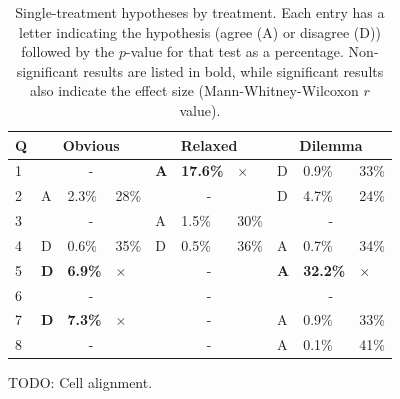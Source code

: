 \begin{table}[!hp]
  \centering
\bgroup
\def\arraystretch{1.1}
\setlength{\tabcolsep}{0.7em}
\begin{tabular}{p{0.3em} | p{0.3em} | p{1.8em} | p{1.2em} | p{0.3em} | p{1.8em} | p{1.2em} | p{0.3em} | p{1.8em} | p{1.2em} |}
Q & \multicolumn{3}{|c|}{Obvious} & \multicolumn{3}{|c|}{Relaxed} & \multicolumn{3}{|c|}{Dilemma} \\
\hline
1  & \multicolumn{3}{|c|}{-} & \textbf{A} & \textbf{17.6\%} & $\times$  & D & 0.9\% & 33\% \\
\hline
2  & A & 2.3\% & 28\%  & \multicolumn{3}{|c|}{-} & D & 4.7\% & 24\% \\
\hline
3  & \multicolumn{3}{|c|}{-} & A & 1.5\% & 30\%  & \multicolumn{3}{|c|}{-}\\
\hline           
4  & D & 0.6\% & 35\%  & D & 0.5\% & 36\%  & A & 0.7\% & 34\% \\
\hline
5  & \textbf{D} & \textbf{6.9\%} & $\times$  & \multicolumn{3}{|c|}{-} & \textbf{A} & \textbf{32.2\%} & $\times$  \\
\hline
6  & \multicolumn{3}{|c|}{-} & \multicolumn{3}{|c|}{-} & \multicolumn{3}{|c|}{-}\\
\hline
7  & \textbf{D} & \textbf{7.3\%} & $\times$  & \multicolumn{3}{|c|}{-} & A & 0.9\% & 33\% \\
\hline
8  & \multicolumn{3}{|c|}{-} & \multicolumn{3}{|c|}{-} & A & 0.1\% & 41\% \\
\hline
\end{tabular}
\egroup
  \caption{Single-treatment hypotheses by treatment. Each entry has a letter indicating the hypothesis (agree (A) or disagree (D)) followed by the $p$-value for that test as a percentage. Non-significant results are listed in bold, while significant results also indicate the effect size (Mann-Whitney-Wilcoxon $r$ value).}
  TODO: Cell alignment.
  \label{tab:single-results}
\end{table}


